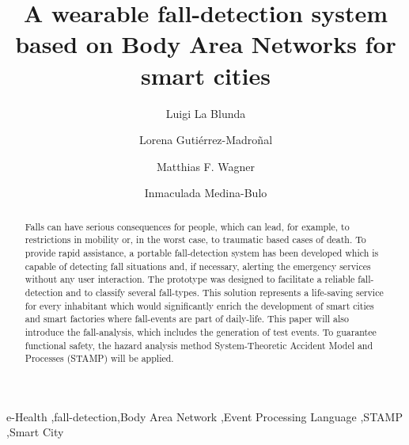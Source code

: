 \documentclass[review]{elsarticle}
\begin{document}
\begin{frontmatter}

\title{A wearable fall-detection system based on Body Area Networks for smart cities}

\author{Luigi La Blunda}
\author{Lorena Guti\'errez-Madro\~nal}
\author{Matthias F. Wagner}
\author{Inmaculada Medina-Bulo}
\address[label1]{WSN and IOT Research Group Frankfurt University of Applied Sciences, Nibelungenplatz 1, 60318 Frankfurt am Main, Germany}
\address[label2]{UCASE Software Engineering Research group, University of Cádiz, Av. Universidad de Cádiz, 10, 11519 Puerto Real, Spain}



%
%

\begin{abstract}
Falls can have serious consequences for people, which can lead, for example, to restrictions in mobility or, in the worst case, to traumatic based cases of death. To provide rapid assistance, a portable fall-detection system has been developed which is capable of detecting fall situations and, if necessary, alerting the emergency services without any user interaction. The prototype was designed to facilitate a reliable fall-detection and to classify several fall-types. This solution represents a life-saving service for every inhabitant which would significantly enrich the development of smart cities and smart factories where fall-events are part of daily-life. This paper will also introduce the fall-analysis, which includes the generation of test events. To guarantee functional safety, the hazard analysis method System-Theoretic Accident Model and Processes (STAMP) will be applied. 
\end{abstract}

\begin{keyword}
e-Health \sep fall-detection\sep Body Area Network \sep Event Processing Language \sep STAMP \sep Smart City \ 
\end{keyword}

\end{frontmatter}
\end{document}
